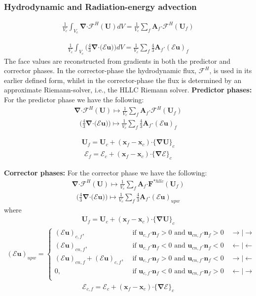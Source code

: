 \documentclass[10pt,letterpaper,notitlepage]{article}
\numberwithin{equation}{section}
\newcommand{\bnabla}{\boldsymbol{\nabla}}
\newcommand{\position}{\mathbf{x}}
\newcommand{\velocity}{\mathbf{u}}
\newcommand{\dotp}{\boldsymbol{\cdot}}
\newcommand{\RadE}{\mathcal{E}}
\newcommand{\HydroF}{\mathcal{F}^H}
\newcommand{\HydroU}{\mathbf{U}}
\newcommand{\AreaVec}{\mathbf{A}}
\newcommand{\NormalVec}{\mathbf{n}}
\newcommand{\beqn}{\begin{equation}\begin{aligned}}
\newcommand{\eeqn}{\end{aligned}\end{equation}}
\begin{document}
\subsubsection{Hydrodynamic and Radiation-energy advection}
\label{section:fv_hydro_and_radE_advection}
\beqn 
\frac{1}{V_c} \int_{V_c} 
\bnabla \dotp \HydroF (\HydroU) 
dV = \frac{1}{V_c}
\sum_f \AreaVec_f \dotp  \HydroF(\HydroU_f)
\eeqn 

\beqn 
\frac{1}{V_c} \int_{V_c} 
\biggr(\frac{4}{3} \bnabla \dotp \bigr(\RadE \velocity)\biggr)
dV = \frac{1}{V_c}
\sum_f \frac{4}{3}  \AreaVec_f \dotp (\RadE \velocity)_f
\eeqn 
The face values are reconstructed from gradients in both the predictor and corrector phases. In the corrector-phase the hydrodynamic flux, $\HydroF$, is used in its earlier defined form, whilst in the corrector-phase the flux is determined by an approximate Riemann-solver, i.e., the HLLC Riemann solver.
\newline
\newline 
\textbf{Predictor phases:}\newline 
For the predictor phase we have the following:
\beqn 
\bnabla \dotp \HydroF (\HydroU)
\mapsto 
\frac{1}{V_c}
\sum_f \AreaVec_f \dotp  \HydroF(\HydroU_f)
\eeqn 
\beqn 
\biggr(\frac{4}{3} \bnabla \dotp \bigr(\RadE \velocity)\biggr)
\mapsto 
\frac{1}{V_c}
\sum_f \frac{4}{3}  \AreaVec_f \dotp (\RadE \velocity)_f
\eeqn 

\beqn 
\HydroU_f = \HydroU_c + (\position_f - \position_c) \dotp \{ \bnabla\HydroU \}_c
\eeqn 
\beqn 
\RadE_f = \RadE_c + (\position_f - \position_c) \dotp \{ \bnabla\RadE \}_c
\eeqn 

\noindent
\textbf{Corrector phases:}\newline
For the corrector phase we have the following:
\beqn 
\bnabla \dotp \HydroF (\HydroU)
\mapsto 
\frac{1}{V_c}
\sum_f \AreaVec_f \dotp  \mathbf{F}^{*hllc}(\HydroU_f)
\eeqn 
\beqn 
\biggr(\frac{4}{3} \bnabla \dotp \bigr(\RadE \velocity)\biggr)
\mapsto 
\frac{1}{V_c}
\sum_f \frac{4}{3}  \AreaVec_f \dotp (\RadE \velocity)_{upw}
\eeqn 
where
\beqn 
\HydroU_f = \HydroU_c+ (\position_f - \position_c) \dotp \{ \bnabla\HydroU \}_c
\eeqn  
\beqn
(\RadE \velocity)_{upw} =
\begin{cases}
	(\RadE \velocity)_{c,f} , &\text{ if } 
	\velocity_{c,f} \dotp  \NormalVec_f > 0 \text{ and } \velocity_{cn,f} \dotp  \NormalVec_f > 0 
	\quad  \rightarrow | \rightarrow \\
	(\RadE \velocity)_{cn,f} , &\text{ if } 
	\velocity_{c,f} \dotp  \NormalVec_f < 0 \text{ and } \velocity_{cn,f} \dotp  \NormalVec_f < 0
	\quad  \leftarrow | \leftarrow \\
	(\RadE \velocity)_{cn,f} + (\RadE \velocity)_{c,f}, &\text{ if } 
	\velocity_{c,f} \dotp  \NormalVec_f > 0 \text{ and } \velocity_{cn,f} \dotp  \NormalVec_f < 0 
	\quad  \rightarrow | \leftarrow \\
	0, &\text{ if } 
	\velocity_{c,f} \dotp  \NormalVec_f < 0 \text{ and } \velocity_{cn,f} \dotp  \NormalVec_f > 0
	\quad  \leftarrow | \rightarrow \\
\end{cases}
\eeqn 
\beqn 
\RadE_{c,f} = \RadE_c + (\position_f - \position_c) \dotp \{ \bnabla\RadE \}_c
\eeqn
\end{document}
